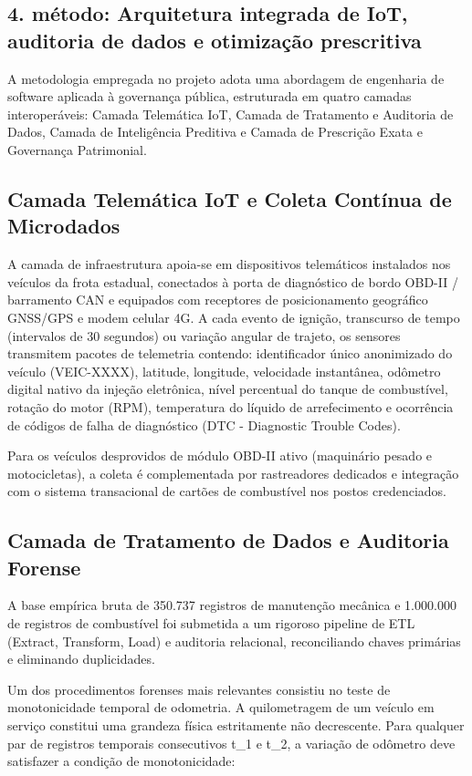 \documentclass[12pt,a4paper]{article}
\begin{document}
\subsection{4. método: Arquitetura integrada de IoT, auditoria de dados e otimização prescritiva}

A metodologia empregada no projeto adota uma abordagem de engenharia de software aplicada à governança pública, estruturada em quatro camadas interoperáveis: Camada Telemática IoT, Camada de Tratamento e Auditoria de Dados, Camada de Inteligência Preditiva e Camada de Prescrição Exata e Governança Patrimonial.


\subsection{Camada Telemática IoT e Coleta Contínua de Microdados}

A camada de infraestrutura apoia-se em dispositivos telemáticos instalados nos veículos da frota estadual, conectados à porta de diagnóstico de bordo OBD-II / barramento CAN e equipados com receptores de posicionamento geográfico GNSS/GPS e modem celular 4G. A cada evento de ignição, transcurso de tempo (intervalos de 30 segundos) ou variação angular de trajeto, os sensores transmitem pacotes de telemetria contendo: identificador único anonimizado do veículo (VEIC-XXXX), latitude, longitude, velocidade instantânea, odômetro digital nativo da injeção eletrônica, nível percentual do tanque de combustível, rotação do motor (RPM), temperatura do líquido de arrefecimento e ocorrência de códigos de falha de diagnóstico (DTC - Diagnostic Trouble Codes).

Para os veículos desprovidos de módulo OBD-II ativo (maquinário pesado e motocicletas), a coleta é complementada por rastreadores dedicados e integração com o sistema transacional de cartões de combustível nos postos credenciados.


\subsection{Camada de Tratamento de Dados e Auditoria Forense}

A base empírica bruta de 350.737 registros de manutenção mecânica e 1.000.000 de registros de combustível foi submetida a um rigoroso pipeline de ETL (Extract, Transform, Load) e auditoria relacional, reconciliando chaves primárias e eliminando duplicidades.

Um dos procedimentos forenses mais relevantes consistiu no teste de monotonicidade temporal de odometria. A quilometragem de um veículo em serviço constitui uma grandeza física estritamente não decrescente. Para qualquer par de registros temporais consecutivos t\_1 e t\_2, a variação de odômetro deve satisfazer a condição de monotonicidade:
\end{document}
